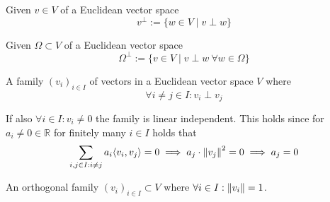 \begin{definition}
   Given \(v \in V\) of a Euclidean vector space
   \[v^\perp := \{w \in V \mid v \perp w\}\]
\end{definition}

\begin{definition}
   Given \(\Omega \subset V\) of a Euclidean vector space
   \[\Omega^\perp := \{v \in V \mid v \perp w~\forall w \in \Omega\}\]
\end{definition}

\begin{definition}\label{def:orthog_fam}
   A family \((v_i)_{i \in I}\) of vectors in a Euclidean vector space \(V\) where
   \[\forall i \neq j \in I: v_i \perp v_j\]
\end{definition}
\begin{remark}
   If also \(\forall i \in I: v_i \neq 0\) the family is linear independent.
   This holds since for \(a_i \neq 0 \in \mathbb{R}\) for finitely many \(i \in I\) holds that
   \[\sum_{i, j \in I: i \neq j} a_i \langle v_i, v_j \rangle = 0 \implies a_j \cdot \left\lVert v_j\right\rVert^2 = 0 \implies a_j = 0\]
\end{remark}

\begin{definition}
   An orthogonal family \((v_i)_{i \in I} \subset V\) where \(\forall i \in I: \left\lVert v_i\right\rVert = 1\).
\end{definition}

